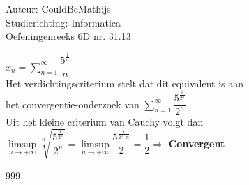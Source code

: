 \documentclass[a4paper]{article}
\begin{document}
  
\noindent \large Auteur: CouldBeMathijs \\
\noindent \large Studierichting: Informatica\\
\noindent \large Oefeningenreeks 6D nr. 31.13\\

\medskip

\normalsize

$x_n = \displaystyle\sum_{n=1}^{\infty} \dfrac{5^{\tfrac{1}{n}}}{n}$\\

Het verdichtingscriterium stelt dat dit equivalent is aan\\

het convergentie-onderzoek van $\displaystyle\sum_{n=1}^{\infty} \dfrac{5^{\tfrac{1}{2^n}}}{2^n}$\\

Uit het kleine criterium van Cauchy volgt dan\\

$\limsup\limits_{n\rightarrow +\infty} \sqrt[n]{\dfrac{5^{\tfrac{1}{2^n}}}{2^n}} = \limsup\limits_{n\rightarrow +\infty} \dfrac{5^{\tfrac{1}{2^n \cdot n}}}{2} = \dfrac{1}{2} \Rightarrow$ \textbf{Convergent}

\begin{thebibliography}{999}
\end{thebibliography}
\end{document}

